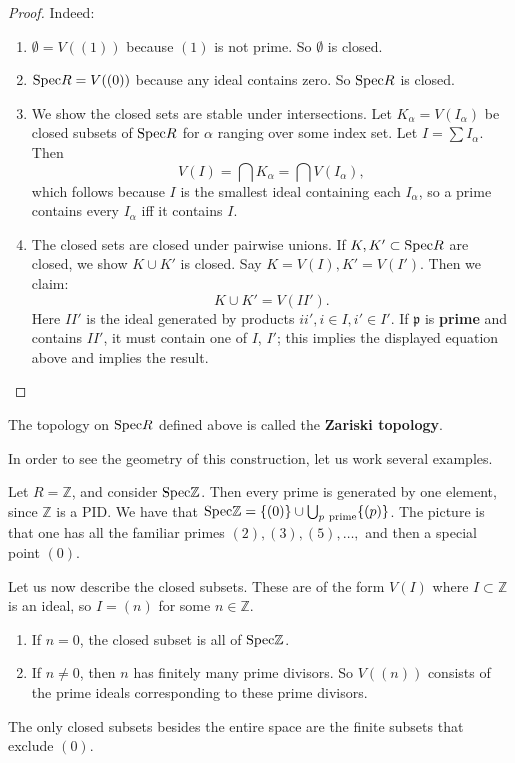 \begin{proof} 
Indeed:
\begin{enumerate}
\item $\emptyset = V((1))$ because $(1)$ is not prime. So $\emptyset$ is closed. 
\item $\mathrm{Spec} R = V((0))$ because any ideal contains zero. So $\mathrm{Spec} R$ is
closed.
\item  We show the closed sets are stable under intersections.  Let
$K_{\alpha} = V(I_{\alpha})$ be closed subsets of $\mathrm{Spec} R$ for $\alpha$
ranging over some index set.  Let $I
= \sum I_{\alpha}$. Then 
\[ V(I) = \bigcap K_{\alpha} = \bigcap V(I_{\alpha}),  \]
which follows because $I$ is the smallest ideal containing each $I_{\alpha}$,
so a prime contains every $I_{\alpha}$ iff it contains $I$.  
\item The closed sets are closed under pairwise unions. If $K,K' \subset \mathrm{Spec}
R$ are closed, we show $K \cup K'$ is closed.  Say $K= V(I), K' = V(I')$. Then
we claim: 
\[ K \cup K'  = V(II').  \]
Here $II'$ is the ideal generated by products $ii', i \in I, i' \in I'$. If
$\mathfrak{p}$ is \textbf{prime} and contains $II'$, it must contain one of $I$, $I'$;
this implies the displayed equation above and implies the result.
\end{enumerate}
\end{proof} 
\begin{definition} 
The topology on $\mathrm{Spec} R$ defined above is called the \textbf{Zariski topology}.
\end{definition} 

In order to see the geometry of this construction, let us work several examples.

\begin{example} 
Let $R = \mathbb{Z}$, and consider $\mathrm{Spec} \mathbb{Z}$. Then every prime is generated by one element, since
$\mathbb{Z}$ is a PID. We have that $\mathrm{Spec} \mathbb{Z} = \{(0)\} \cup \bigcup_{p \
\mathrm{prime}} \{ (p)\}$.  The picture is that one has all the familiar primes $(2), (3),
(5), \dots, $ and then a special point $(0)$.

Let us now describe the closed subsets. These are of the form $V(I)$ where $I
\subset \mathbb{Z}$ is an ideal, so $I = (n)$ for some $n \in \mathbb{Z}$. 

\begin{enumerate}
\item If $n=0$, the closed subset is all of $\mathrm{Spec} \mathbb{Z}$. 
\item If $n \neq 0$, then $n$ has finitely many prime divisors. So $V((n))$ consists
of the prime ideals corresponding to these prime divisors.  
\end{enumerate}

The only closed subsets besides the entire space are the finite subsets
that exclude $(0)$.  
\end{example} 


